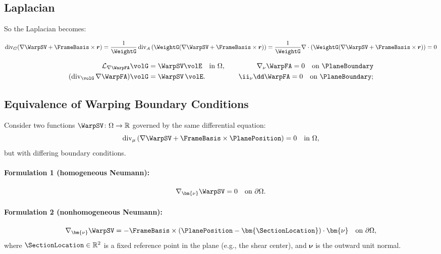 \subsection{Laplacian}
So the Laplacian becomes:

$$
\operatorname{div}_{G}(\nabla \WarpSV 
+\FrameBasis \times \boldsymbol{r})
=
\frac{1}{\WeightG} \operatorname{div}_{A} \left(\WeightG (\nabla \WarpSV +\FrameBasis \times \boldsymbol{r})\right)
=
\frac{1}{\WeightG} \nabla \cdot\left(\WeightG (\nabla \WarpSV +\FrameBasis \times \boldsymbol{r})\right)
=0
$$

\begin{equation*}
\begin{aligned}
\mathcal{L}_{\nabla \WarpFA} \volG &= \WarpSV \volE  
\quad\text{in }\Omega, \\
( \operatorname{div}_{\volG}\nabla\WarpFA )\volG
  &=\WarpSV\,\volE.
\end{aligned}
\qquad
\begin{aligned}
\nabla_\nu \WarpFA = 0 \quad \text{on } \PlaneBoundary \\
\ii_{\nu}\dd\WarpFA = 0
\quad\text{on }\PlaneBoundary;
\end{aligned}
\end{equation*}


\subsection{Equivalence of Warping Boundary Conditions}

Consider two functions \( \WarpSV \colon \Omega \to \mathbb{R} \) governed by the same differential equation:
\[
\operatorname{div}_\mu \left( \nabla \WarpSV + \FrameBasis \times \PlanePosition \right) = 0 \quad \text{in } \Omega,
\]
but with differing boundary conditions.

\paragraph{Formulation 1 (homogeneous Neumann):}
\begin{equation}
\nabla_{\bm{\nu}} \WarpSV = 0 \quad \text{on } \partial \Omega.
\label{eq:hom-neumann}
\end{equation}

\paragraph{Formulation 2 (nonhomogeneous Neumann):}
\begin{equation}
\nabla_{\bm{\nu}} \WarpSV = -\FrameBasis \times (\PlanePosition - \bm{\SectionLocation}) \cdot \bm{\nu}
\quad \text{on } \partial \Omega,
\label{eq:nonhom-neumann}
\end{equation}
where \( \SectionLocation \in \mathbb{R}^2 \) is a fixed reference point in the plane (e.g., the shear center), and \( \bm{\nu} \) is the outward unit normal.

